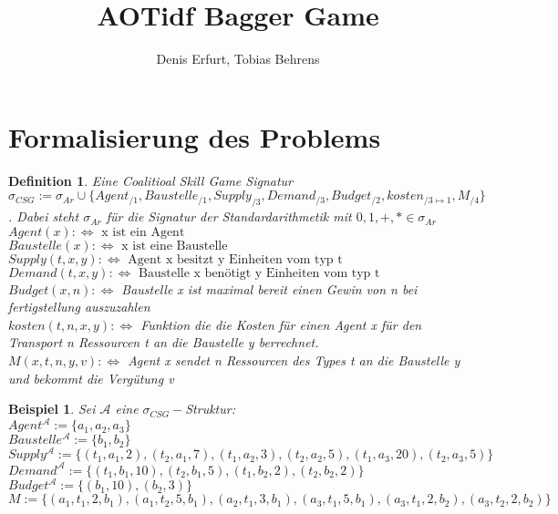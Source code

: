 \documentclass[12pt]{article}
\theoremstyle{break}
\newtheorem{definition}{Definition}
\newtheorem{bsp}{Beispiel}
\begin{document}
\title{AOTidf Bagger Game}
\author{Denis Erfurt, Tobias Behrens}
\maketitle

\section{Formalisierung des Problems}

\begin{definition}
  Eine Coalitioal Skill Game Signatur \\$\sigma_{CSG}:=\sigma_{Ar}\cup\{Agent_{/1}, Baustelle_{/1}, Supply_{/3}, Demand_{/3}, Budget_{/2}, kosten_{/3\mapsto 1}, M_{/4} \}$. Dabei steht $\sigma_{Ar}$ für die Signatur der Standardarithmetik mit $0,1,+,*\in\sigma_{Ar}$
    $Agent(x) :\Leftrightarrow\text{ x ist ein Agent}$ \\
    $Baustelle(x) :\Leftrightarrow\text{ x ist eine Baustelle}$ \\
    $Supply(t, x, y) :\Leftrightarrow\text{ Agent x besitzt y Einheiten vom typ t}$ \\
    $Demand(t, x, y) :\Leftrightarrow\text{ Baustelle x benötigt y Einheiten vom typ t}$ \\
    $Budget(x, n) :\Leftrightarrow$
    Baustelle x ist maximal bereit einen Gewin von n bei fertigstellung auszuzahlen \\
    $kosten(t, n, x, y):\Leftrightarrow$ Funktion die die Kosten für einen Agent x für den Transport n Ressourcen t an die Baustelle y berrechnet.\\
    $M(x, t, n, y, v) :\Leftrightarrow$ Agent x sendet n Ressourcen des Types t an die Baustelle y und bekommt die Vergütung v
\end{definition}

\begin{bsp}
  Sei $\mathcal{A}$ eine $\sigma_{CSG}-$Struktur:\\
  $Agent^\mathcal{A} := \{a_1, a_2, a_3\}$ \\
  $Baustelle^\mathcal{A} := \{b_1, b_2\}$ \\
  $Supply^\mathcal{A} := \{
  (t_1, a_1, 2),
  (t_2, a_1, 7),
  (t_1, a_2, 3),
  (t_2, a_2, 5),
  (t_1, a_3, 20),
  (t_2, a_3, 5)
  \}$ \\
  $Demand^\mathcal{A} := \{
  (t_1, b_1, 10),
  (t_2, b_1, 5),
  (t_1, b_2, 2),
  (t_2, b_2, 2)
  \}$ \\
  $Budget^\mathcal{A}:= \{
  (b_1, 10),
  (b_2, 3)
  \}$ \\
  $M := \{
  (a_1, t_1, 2, b_1),
  (a_1, t_2, 5, b_1),
  (a_2, t_1, 3, b_1),
  (a_3, t_1, 5, b_1),
  (a_3, t_1, 2, b_2),
  (a_3, t_2, 2, b_2)
  \}$
\end{bsp}
\end{document}

